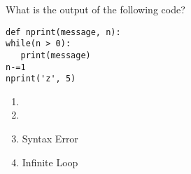 \question
What is the output of the following code?
\begin{lstlisting}
def nprint(message, n):
while(n > 0):
   print(message)
n-=1
nprint('z', 5)
\end{lstlisting}

\begin{enumerate}
\item \lstinline@zzzz@
\item \lstinline@zzzzz@
\item Syntax Error
\item Infinite Loop
\end{enumerate}

